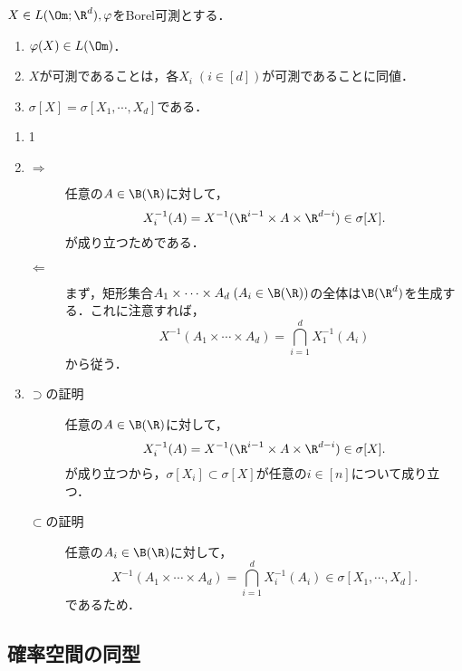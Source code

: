 \documentclass[uplatex,dvipdfmx]{jsreport}
\begin{document}
\begin{proposition}[積写像の可測性]
    $X\in L(\Om;\R^d),\varphi$をBorel可測とする．
    \begin{enumerate}
        \item $\varphi(X)\in L(\Om)$．
        \item $X$が可測であることは，各$X_i\;(i\in[d])$が可測であることに同値．
        \item $\sigma[X]=\sigma[X_1,\cdots,X_d]$である．
    \end{enumerate}
\end{proposition}
\begin{Proof}\mbox{}
    \begin{enumerate}
        \item 1
        \item \begin{description}
            \item[$\Rightarrow$] 任意の$A\in\B(\R)$に対して，
            \[X_i^{-1}(A)=X^{-1}(\R^{i-1}\times A\times\R^{d-i})\in\sigma[X].\]
            が成り立つためである．
            \item[$\Leftarrow$] まず，矩形集合$A_1\times\cdots\times A_d\;(A_i\in\B(\R))$の全体は$\B(\R^d)$を生成する．これに注意すれば，
            \[X^{-1}(A_1\times\cdots\times A_d)=\bigcap_{i=1}^dX_1^{-1}(A_i)\]
            から従う．
        \end{description}
        \item \begin{description}
            \item[$\supset$の証明] 任意の$A\in\B(\R)$に対して，
            \[X_i^{-1}(A)=X^{-1}(\R^{i-1}\times A\times\R^{d-i})\in\sigma[X].\]
            が成り立つから，$\sigma[X_i]\subset\sigma[X]$が任意の$i\in[n]$について成り立つ．
            \item[$\subset$の証明] 任意の$A_i\in\B(\R)$に対して，
            \[X^{-1}(A_1\times\cdots\times A_d)=\bigcap_{i=1}^dX_i^{-1}(A_i)\in\sigma[X_1,\cdots,X_d].\]
            であるため．
        \end{description}
    \end{enumerate}
\end{Proof}

\subsection{確率空間の同型}
\end{document}
